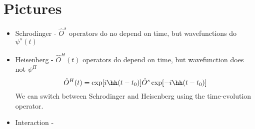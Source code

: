\documentclass[a4paper, 11pt, normalem]{report}
\begin{document}
\section{Pictures}
\begin{itemize}
    \item Schrodinger - $\hat{O}^{s}$ operators do no depend on time, but wavefunctions do $\psi^s(t)$
    \item Heisenberg - $\hat{O}^H(t)$ operators do depend on time, but wavefunction does not $\psi^H$
        \begin{equation}
            \hat{O}^H(t) = \exp[i\hh(t-t_0)]\hat{O}^s\exp[-i\hh(t-t_0)]
        \end{equation}
        We can switch between Schrodinger and Heisenberg using the time-evolution operator. 
    \item Interaction - 
\end{itemize}
\end{document}
